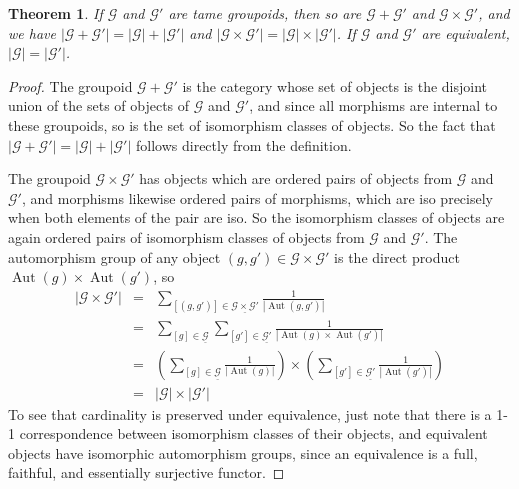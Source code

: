 \documentclass{amsart} \usepackage{amsmath,amssymb,bbm}
\newcommand{\opname}[1]{\operatorname{#1}}
\newtheorem{theorem}{Theorem}
\begin{document}
\begin{theorem}
  If $\mathcal{G}$ and $\mathcal{G'}$ are tame groupoids, then so are
  $\mathcal{G}+\mathcal{G}'$ and $\mathcal{G} \times \mathcal{G}'$,
  and we have $| \mathcal{G} + \mathcal{G}' | = | \mathcal{G}
  | + | \mathcal{G}' |$ and $| \mathcal{G} \times \mathcal{G}' | = |
  \mathcal{G} | \times | \mathcal{G}' |$.  If $\mathcal{G}$ and
  $\mathcal{G'}$ are equivalent, $| \mathcal{G} | = | \mathcal{G'} |$.
\end{theorem}

\begin{proof}
  The groupoid $\mathcal{G} + \mathcal{G'}$ is the category whose set of
  objects is the disjoint union of the sets of objects of $\mathcal{G}$ and
  $\mathcal{G'}$, and since all morphisms are internal to these groupoids, so
  is the set of isomorphism classes of objects.  So the fact that $|
  \mathcal{G} + \mathcal{G}' | = | \mathcal{G} | + | \mathcal{G}' |$ follows
  directly from the definition.
  
  The groupoid $\mathcal{G} \times \mathcal{G}'$ has objects which are ordered
  pairs of objects from $\mathcal{G}$ and $\mathcal{G'}$, and morphisms
  likewise ordered pairs of morphisms, which are iso precisely when both
  elements of the pair are iso.  So the isomorphism classes of objects are
  again ordered pairs of isomorphism classes of objects from $\mathcal{G}$ and
  $\mathcal{G'}$.  The automorphism group of any object $( g, g' ) \in
  \mathcal{G} \times \mathcal{G}'$ is the direct product $\opname{Aut} ( g )
  \times \opname{Aut} ( g' )$, so
    \begin{eqnarray}
        |\mathcal{G} \times \mathcal{G}' | & = & \sum_{[ ( g, g' ) ] \in
       \mathcal{\underline{G \times \mathcal{G}'}}} \frac{1}{| \opname{Aut} ( g,
       g' ) |}\\
        \nonumber & = & \sum_{[ g ] \in \underline{\mathcal{G}}} \sum_{[ g' ] \in
       \underline{\mathcal{G'}}} \frac{1}{| \opname{Aut} ( g ) \times \opname{Aut}
       ( g' ) |}\\
        \nonumber & = & \left( \sum_{[ g ] \in \underline{\mathcal{G}}} \frac{1}{|
       \opname{Aut} ( g ) |} \right) \times \left( \sum_{[ g' ] \in
       \mathcal{\underline{G'}}} \frac{1}{| \opname{Aut} ( g' ) |} \right)\\
       \nonumber & = & | \mathcal{G} | \times | \mathcal{G}' |
    \end{eqnarray}
  To see that cardinality is preserved under equivalence, just note that there
  is a 1-1 correspondence between isomorphism classes of their objects, and
  equivalent objects have isomorphic automorphism groups, since an equivalence
  is a full, faithful, and essentially surjective functor.
  
  
\end{proof}
\end{document}
